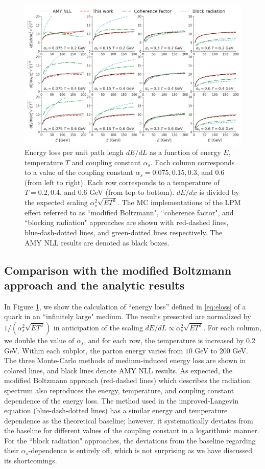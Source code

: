 \documentclass[aps, prc, reprint, amsmath, groupedaddress, nofootinbib]{revtex4-1}
\begin{document}
\begin{figure}
\centering
\includegraphics[width=1.\textwidth]{Eloss_infinite.png}
\caption{Energy loss per unit path lengh $dE/dL$ as a function of energy $E$, temperature $T$ and coupling constant $\alpha_s$. Each column corresponds to a value of the coupling constant $\alpha_s = 0.075, 0.15, 0.3$, and $0.6$ (from left to right). Each row corresponds to a temperature of $T = 0.2, 0.4$, and $0.6$ GeV (from top to bottom). $dE/dx$ is divided by the expected scaling $\alpha_s^2 \sqrt{ET^3}$. The MC implementations of the LPM effect referred to as ``modified Boltzmann", ``coherence factor", and ``blocking radiation" approaches are shown with red-dashed lines, blue-dash-dotted lines, and green-dotted lines respectively. The AMY NLL results are denoted as black boxes.}
\label{fig:eloss-inf}
\end{figure}


\subsection{Comparison with the modified Boltzmann approach and the analytic results}
In Figure \ref{fig:eloss-inf}, we show the calculation of ``energy loss'' defined in \ref{eq:eloss} of a quark in an ``infinitely large" medium. 
The results presented are normalized by $1/(\alpha_s^2 \sqrt{ET^3})$ in anticipation of the scaling $dE/dL \propto \alpha_s^2 \sqrt{ET^3}$.
For each column, we double the value of $\alpha_s$, and for each row, the temperature is increased by $0.2$ GeV. 
Within each subplot, the parton energy varies from $10$ GeV to $200$ GeV.
The three Monte-Carlo methods of medium-induced energy loss are shown in colored lines, and black lines denote AMY NLL  results.
As expected, the modified Boltzmann approach (red-dashed lines) which describes the radiation spectrum also reproduces the energy, temperature, and coupling constant dependence of the energy loss.
The method used in the improved-Langevin equation (blue-dash-dotted lines) has a similar energy and temperature dependence as the theoretical baseline; however, it systematically deviates from the baseline for different values of the coupling constant in a logarithmic manner.
For the ``block radiation" approaches, the deviations from the baseline regarding their $\alpha_s$-dependence is entirely off, which is not surprising as we have discussed its shortcomings.
\end{document}
